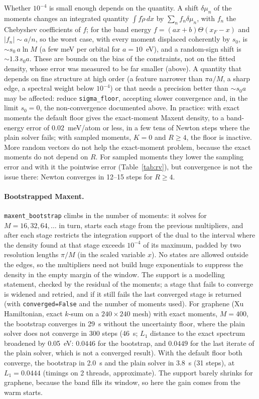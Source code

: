 \documentclass[reprint,nofootinbib,superscriptaddress,amsmath,amssymb,aps,prb,floatfix]{revtex4-2}
\begin{document}
Whether $10^{-4}$ is small enough depends on the quantity. A shift $\delta\mu_n$ of the moments changes an integrated quantity $\int f\tilde\rho\,dx$ by $\sum_nf_n\delta\mu_n$, with $f_n$ the Chebyshev coefficients of $f$; for the band energy $f=(ax+b)\Theta(x_F-x)$ and $|f_n|\sim a/n$, so the worst case, with every moment displaced coherently by $s_0$, is $\sim s_0\,a\ln M$ (a few meV per orbital for $a=10$~eV), and a random-sign shift is $\sim1.3\,s_0a$. These are bounds on the bias of the constraints, not on the fitted density, whose error was measured to be far smaller (above). A quantity that depends on fine structure at high order (a feature narrower than $\pi a/M$, a sharp edge, a spectral weight below $10^{-4}$) or that needs a precision better than $\sim s_0a$ may be affected: reduce \texttt{sigma\_floor}, accepting slower convergence and, in the limit $s_0=0$, the non-convergence documented above.
In practice: with exact moments the default floor gives the exact-moment Maxent density, to a band-energy error of $0.02$~meV/atom or less, in a few tens of Newton steps where the plain solver fails; with sampled moments, $K=0$ and $R\ge4$, the floor is inactive. More random vectors do not help the exact-moment problem, because the exact moments do not depend on $R$. For sampled moments they lower the sampling error and with it the pointwise error (Table~\ref{tab:rv}), but convergence is not the issue there: Newton converges in 12--15 steps for $R\ge4$.

\paragraph*{Bootstrapped Maxent.}
\texttt{maxent\_bootstrap} climbs in the number of moments: it solves for $M=16,32,64,\dots$ in turn, starts each stage from the previous multipliers, and after each stage restricts the integration support of the dual to the interval where the density found at that stage exceeds $10^{-4}$ of its maximum, padded by two resolution lengths $\pi/M$ (in the scaled variable $x$).
No states are allowed outside the edges, so the multipliers need not build huge exponentials to suppress the density in the empty margin of the window.
The support is a modelling statement, checked by the residual of the moments; a stage that fails to converge is widened and retried, and if it still fails the last converged stage is returned (with \texttt{converged=False} and the number of moments used).
For graphene (Xu Hamiltonian, exact $k$-sum on a $240\times240$ mesh) with exact moments, $M=400$, the bootstrap converges in 29~s without the uncertainty floor, where the plain solver does not converge in 300 steps (46~s; $L_1$ distance to the exact spectrum broadened by 0.05~eV: $0.0446$ for the bootstrap, and $0.0449$ for the last iterate of the plain solver, which is not a converged result). With the default floor both converge, the bootstrap in 2.0~s and the plain solver in 3.8~s (31 steps), at $L_1=0.0444$ (timings on 2 threads, approximate). The support barely shrinks for graphene, because the band fills its window, so here the gain comes from the warm starts.
\end{document}
